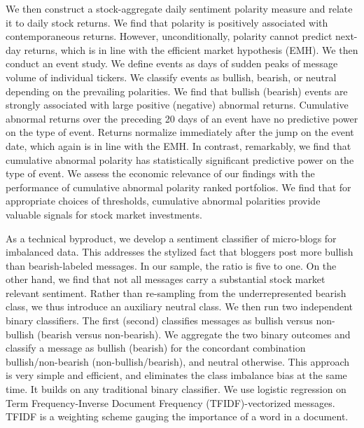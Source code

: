 We then construct a stock-aggregate daily sentiment polarity measure and relate it to daily stock returns. We find that polarity is positively associated with contemporaneous returns. However, unconditionally, polarity cannot predict next-day returns, which is in line with the efficient market hypothesis (EMH). We then conduct an event study. We define events as days of sudden peaks of message volume of individual tickers. We classify events as bullish, bearish, or neutral depending on the prevailing polarities. We find that bullish (bearish) events are strongly associated with large positive (negative) abnormal returns. Cumulative abnormal returns over the preceding 20 days of an event have no predictive power on the type of event. Returns normalize immediately after the jump on the event date, which again is in line with the EMH. In contrast, remarkably, we find that cumulative abnormal polarity has statistically significant predictive power on the type of event. We assess the economic relevance of our findings with the performance of cumulative abnormal polarity ranked portfolios. We find that for appropriate choices of thresholds, cumulative abnormal polarities provide valuable signals for stock market investments.

As a technical byproduct, we develop a sentiment classifier of micro-blogs for imbalanced data. This addresses the stylized fact that bloggers post more bullish than bearish-labeled messages. In our sample, the ratio is five to one. On the other hand, we find that not all messages carry a substantial stock market relevant sentiment. Rather than re-sampling from the underrepresented bearish class, we thus introduce an auxiliary neutral class. We then run two independent binary classifiers. The first (second) classifies messages as bullish versus non-bullish (bearish versus non-bearish). We aggregate the two binary outcomes and classify a message as bullish (bearish) for the concordant combination bullish/non-bearish (non-bullish/bearish), and neutral otherwise. This approach is very simple and efficient, and eliminates the class imbalance bias at the same time. It builds on any traditional binary classifier. We use logistic regression on Term Frequency-Inverse Document Frequency (TFIDF)-vectorized messages. TFIDF is a weighting scheme gauging the importance of a word in a document.


